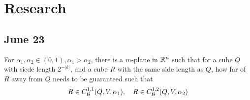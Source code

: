 \section{Research}


\subsection{June 23 }


\begin{lemma}
    For $\alpha_1, \alpha_2\in(0,1), \alpha_1>\alpha_2$, there is a $m$-plane in $\mathbb{R}^n$ such that for a cube $Q$ with siede length $2^{-|k|}$, and a cube $R$ with the same side length as $Q$, how far of $R$ away from $Q$ needs to be guaranteed such that
    \begin{equation}\label{eq:condition}
        R\in C_\mathcal B^{1,1}(Q, V, \alpha_1), \quad R\in  C_\mathcal B^{1,2}(Q, V, \alpha_2)
    \end{equation}
\end{lemma}
